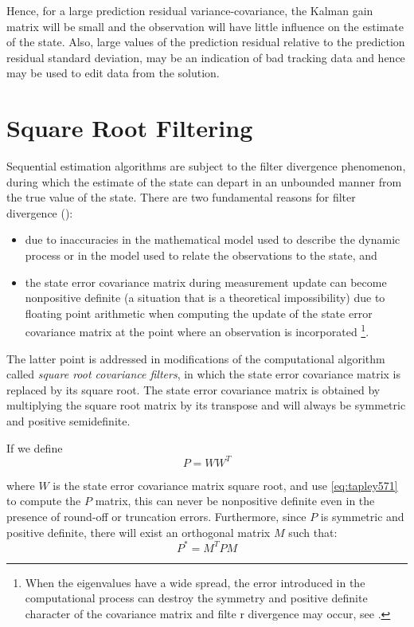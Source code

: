 Hence, for a large prediction residual variance-covariance, the Kalman gain matrix 
will be small and the observation will have little influence on the estimate of the 
state. Also, large values of the prediction residual relative to the prediction residual 
standard deviation, may be an indication of bad tracking data and hence may be used to 
edit data from the solution.

\section{Square Root Filtering}
\label{sec:square-root-filtering}
Sequential estimation algorithms are subject to the filter divergence phenomenon, during 
which the estimate of the state can depart in an unbounded manner from the true value 
of the state. There are two fundamental reasons for filter divergence (\cite{tapley}):
\begin{itemize}
  \item due to inaccuracies in the mathematical model used to describe the dynamic 
  process or in the model used to relate the observations to the state, and
  \item the state error covariance matrix during measurement update can become nonpositive 
  definite (a situation that is a theoretical impossibility) due to floating point 
  arithmetic when computing the update of the state error covariance matrix at the 
  point where an observation is incorporated \footnote{When the eigenvalues have a wide spread, the error
introduced in the computational process can destroy the symmetry and positive
definite character of the covariance matrix and filte r divergence may occur, see \cite{tapley}.}.
\end{itemize}

The latter point is addressed in modifications of the computational algorithm called 
\emph{square root covariance filters}, in which the state error covariance matrix is 
replaced by its square root. The state error covariance matrix is obtained by
multiplying the square root matrix by its transpose and will always be symmetric
and positive semidefinite.

If we define
\begin{equation}
\label{eq:tapley571}
P = W W^T
\end{equation}

where \(W\) is the state error covariance matrix square root, and use \ref{eq:tapley571} to 
compute the \(P\) matrix, this can never be nonpositive definite even in the presence 
of round-off or truncation errors. Furthermore, since \(P\) is symmetric and positive 
definite, there will exist an orthogonal matrix \(M\) such that:
\begin{equation}
\label{eq:tapley572}
  P^* = M^T P M
\end{equation}

